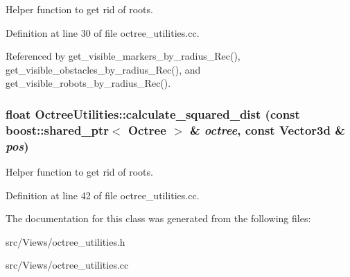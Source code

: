 Helper function to get rid of roots. 

Definition at line 30 of file octree\_\-utilities.cc.

Referenced by get\_\-visible\_\-markers\_\-by\_\-radius\_\-Rec(), get\_\-visible\_\-obstacles\_\-by\_\-radius\_\-Rec(), and get\_\-visible\_\-robots\_\-by\_\-radius\_\-Rec().\hypertarget{class_octree_utilities_9a9c30e007a5b97651933c3ab76a7801}{
\subsubsection[calculate\_\-squared\_\-dist]{\setlength{\rightskip}{0pt plus 5cm}float OctreeUtilities::calculate\_\-squared\_\-dist (const boost::shared\_\-ptr$<$ {\bf Octree} $>$ \& {\em octree}, \/  const Vector3d \& {\em pos})}}
\label{class_octree_utilities_9a9c30e007a5b97651933c3ab76a7801}


Helper function to get rid of roots. 

Definition at line 42 of file octree\_\-utilities.cc.

The documentation for this class was generated from the following files:\begin{CompactItemize}
\item 
src/Views/octree\_\-utilities.h\item 
src/Views/octree\_\-utilities.cc\end{CompactItemize}
